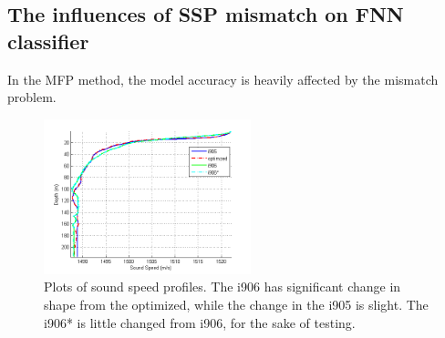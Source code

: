 \subsection{The influences of SSP mismatch on FNN classifier}
In the MFP method, the model accuracy is heavily affected by the mismatch problem\cite{tolstoy1989sensitivity,feuillade1989environmental,del1988effects}.
\begin{figure}
\includegraphics[width=6cm]{figure/ssp4}
\caption{Plots of sound speed profiles. The i906 has significant change in shape from the optimized, while the change in the i905 is slight. The i906{*} is little changed from i906, for the sake of testing.}
\end{figure}
